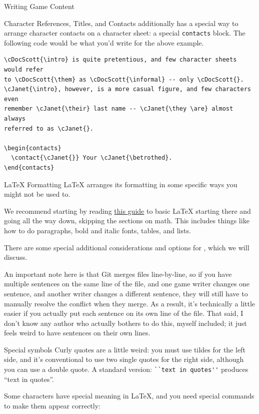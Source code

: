 \documentclass[sheet]{GameTexBase}
\begin{document}
\begin{section}{Writing Game Content}
\begin{subsection}{Character References, Titles, and Contacts}
\gametex{} additionally has a special way to arrange character contacts on a character sheet: a special \lstinline|contacts| block.  The following \gametex{} code would be what you'd write for the above example.
\begin{verbatim}
\cDocScott{\intro} is quite pretentious, and few character sheets would refer
to \cDocScott{\them} as \cDocScott{\informal} -- only \cDocScott{}.
\cJanet{\intro}, however, is a more casual figure, and few characters even
remember \cJanet{\their} last name -- \cJanet{\they \are} almost always
referred to as \cJanet{}.

\begin{contacts}
  \contact{\cJanet{}} Your \cJanet{\betrothed}.
\end{contacts}
\end{verbatim}
\end{subsection}
\begin{subsection}{\LaTeX{} Formatting}
LaTeX arranges its formatting in some specific ways you might not be used to.

We recommend starting by reading \href{https://www.overleaf.com/learn/latex/Learn_LaTeX_in_30_minutes#Adding_comments}{this guide} to basic \LaTeX{} starting there and going all the way down, skipping the sections on math.
This includes things like how to do paragraphs, bold and italic fonts, tables, and lists.

There are some special additional considerations and options for \gametex{}, which we will discuss.

An important note here is that Git merges files line-by-line, so if you have multiple sentences on the same line of the file, and one game writer changes one sentence, and another writer changes a different sentence, they will still have to manually resolve the conflict when they merge.  As a result, it's technically a little easier if you actually put each sentence on its own line of the file.  That said, I don't know any author who actually bothers to do this, myself included; it just feels weird to have sentences on their own lines.

\begin{subsubsection}{Special symbols}
Curly quotes are a little weird: you must use tildes for the left side, and it's conventional to use two single quotes for the right side, although you can use a double quote.  A standard version: \lstinline{``text in quotes''} produces ``text in quotes''.

Some characters have special meaning in \LaTeX{}, and you need special commands to make them appear correctly:


\end{subsubsection}
\end{subsection}
\end{section}
\end{document}

